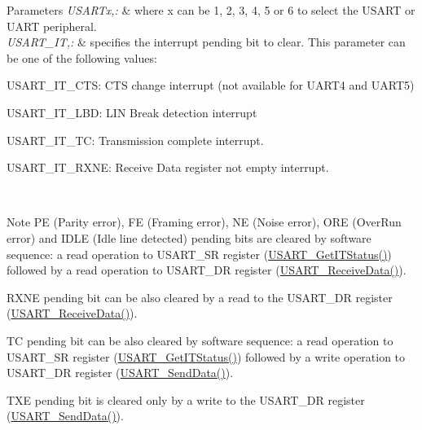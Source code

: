 \begin{DoxyParams}{Parameters}
{\em U\-S\-A\-R\-Tx,\-:} & where x can be 1, 2, 3, 4, 5 or 6 to select the U\-S\-A\-R\-T or U\-A\-R\-T peripheral. \\
\hline
{\em U\-S\-A\-R\-T\-\_\-\-I\-T,\-:} & specifies the interrupt pending bit to clear. This parameter can be one of the following values\-: \begin{DoxyItemize}
\item U\-S\-A\-R\-T\-\_\-\-I\-T\-\_\-\-C\-T\-S\-: C\-T\-S change interrupt (not available for U\-A\-R\-T4 and U\-A\-R\-T5) \item U\-S\-A\-R\-T\-\_\-\-I\-T\-\_\-\-L\-B\-D\-: L\-I\-N Break detection interrupt \item U\-S\-A\-R\-T\-\_\-\-I\-T\-\_\-\-T\-C\-: Transmission complete interrupt. \item U\-S\-A\-R\-T\-\_\-\-I\-T\-\_\-\-R\-X\-N\-E\-: Receive Data register not empty interrupt.\end{DoxyItemize}
\\
\hline
\end{DoxyParams}
\begin{DoxyNote}{Note}
P\-E (Parity error), F\-E (Framing error), N\-E (Noise error), O\-R\-E (Over\-Run error) and I\-D\-L\-E (Idle line detected) pending bits are cleared by software sequence\-: a read operation to U\-S\-A\-R\-T\-\_\-\-S\-R register (\hyperlink{group___u_s_a_r_t_ga93d8f031241bcdbe938d091a85295445}{U\-S\-A\-R\-T\-\_\-\-Get\-I\-T\-Status()}) followed by a read operation to U\-S\-A\-R\-T\-\_\-\-D\-R register (\hyperlink{group___u_s_a_r_t_gac67a91845b0b1d54d31bdfb1c5e9867c}{U\-S\-A\-R\-T\-\_\-\-Receive\-Data()}). 

R\-X\-N\-E pending bit can be also cleared by a read to the U\-S\-A\-R\-T\-\_\-\-D\-R register (\hyperlink{group___u_s_a_r_t_gac67a91845b0b1d54d31bdfb1c5e9867c}{U\-S\-A\-R\-T\-\_\-\-Receive\-Data()}). 

T\-C pending bit can be also cleared by software sequence\-: a read operation to U\-S\-A\-R\-T\-\_\-\-S\-R register (\hyperlink{group___u_s_a_r_t_ga93d8f031241bcdbe938d091a85295445}{U\-S\-A\-R\-T\-\_\-\-Get\-I\-T\-Status()}) followed by a write operation to U\-S\-A\-R\-T\-\_\-\-D\-R register (\hyperlink{group___u_s_a_r_t_ga0b43d42da9540f446d494bf69823c6fb}{U\-S\-A\-R\-T\-\_\-\-Send\-Data()}). 

T\-X\-E pending bit is cleared only by a write to the U\-S\-A\-R\-T\-\_\-\-D\-R register (\hyperlink{group___u_s_a_r_t_ga0b43d42da9540f446d494bf69823c6fb}{U\-S\-A\-R\-T\-\_\-\-Send\-Data()}).
\end{DoxyNote}

